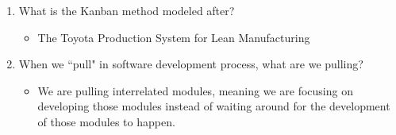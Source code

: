 \documentclass[11pt]{article}
\begin{document}
\begin{enumerate}
    \item What is the Kanban method modeled after?
    \begin{itemize}
     \item The Toyota Production System for Lean Manufacturing
    \end{itemize}
    
    \item When we ``pull" in software development process, what are we pulling?
    \begin{itemize}
    \item We are pulling interrelated modules, meaning we are focusing on developing those modules instead of waiting around for the development of those modules to happen.
    \end{itemize}
    
\end{enumerate}
    
\end{document}
